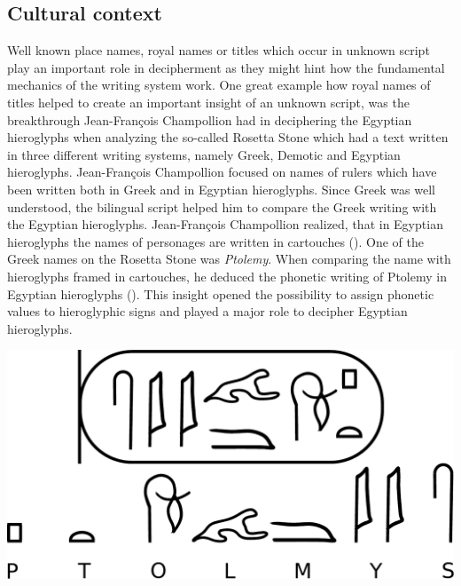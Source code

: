 \documentclass[../main.tex]{subfiles}
\begin{document}
\subsection{Cultural context}
Well known place names, royal names or titles which occur in unknown script
play an important role in decipherment as they might hint how the fundamental mechanics of 
the writing system work.
One great example how royal names of titles helped to create an important insight of an unknown 
script, was the breakthrough Jean-Fran\c{c}ois Champollion had in deciphering the 
Egyptian hieroglyphs when analyzing the so-called Rosetta Stone which had a text written in 
three different writing systems, namely Greek, Demotic and Egyptian hieroglyphs.
Jean-Fran\c{c}ois Champollion focused on names of rulers which have been written both in 
Greek and in Egyptian hieroglyphs. 
Since Greek was well understood, the bilingual script helped him to compare the Greek writing with 
the Egyptian hieroglyphs.
Jean-Fran\c{c}ois Champollion realized, that in Egyptian hieroglyphs the names of personages 
are written in cartouches (\cite[215]{coulmas1991}).
One of the Greek names on the Rosetta Stone was \emph{Ptolemy}.
When comparing the name with hieroglyphs framed in cartouches, he deduced the phonetic writing 
of Ptolemy in Egyptian hieroglyphs ().
This insight opened the possibility to assign phonetic values to hieroglyphic signs and 
played a major role to decipher Egyptian hieroglyphs. 
\begin{center}
    \includegraphics[width=.7\textwidth,keepaspectratio]{img/ptolemy-cartouche}
    \label{fig:terminology-ptolemy-cartouche}
\end{center}
\end{document}
